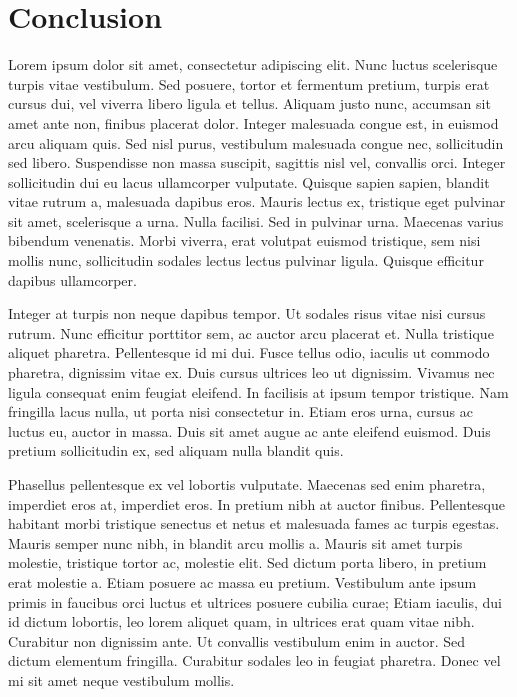 \section{Conclusion}

	Lorem ipsum dolor sit amet, consectetur adipiscing elit. Nunc luctus scelerisque turpis vitae vestibulum. Sed posuere, tortor et fermentum pretium, turpis erat cursus dui, vel viverra libero ligula et tellus. Aliquam justo nunc, accumsan sit amet ante non, finibus placerat dolor. Integer malesuada congue est, in euismod arcu aliquam quis. Sed nisl purus, vestibulum malesuada congue nec, sollicitudin sed libero. Suspendisse non massa suscipit, sagittis nisl vel, convallis orci. Integer sollicitudin dui eu lacus ullamcorper vulputate. Quisque sapien sapien, blandit vitae rutrum a, malesuada dapibus eros. Mauris lectus ex, tristique eget pulvinar sit amet, scelerisque a urna. Nulla facilisi. Sed in pulvinar urna. Maecenas varius bibendum venenatis. Morbi viverra, erat volutpat euismod tristique, sem nisi mollis nunc, sollicitudin sodales lectus lectus pulvinar ligula. Quisque efficitur dapibus ullamcorper.

	Integer at turpis non neque dapibus tempor. Ut sodales risus vitae nisi cursus rutrum. Nunc efficitur porttitor sem, ac auctor arcu placerat et. Nulla tristique aliquet pharetra. Pellentesque id mi dui. Fusce tellus odio, iaculis ut commodo pharetra, dignissim vitae ex. Duis cursus ultrices leo ut dignissim. Vivamus nec ligula consequat enim feugiat eleifend. In facilisis at ipsum tempor tristique. Nam fringilla lacus nulla, ut porta nisi consectetur in. Etiam eros urna, cursus ac luctus eu, auctor in massa. Duis sit amet augue ac ante eleifend euismod. Duis pretium sollicitudin ex, sed aliquam nulla blandit quis.

	Phasellus pellentesque ex vel lobortis vulputate. Maecenas sed enim pharetra, imperdiet eros at, imperdiet eros. In pretium nibh at auctor finibus. Pellentesque habitant morbi tristique senectus et netus et malesuada fames ac turpis egestas. Mauris semper nunc nibh, in blandit arcu mollis a. Mauris sit amet turpis molestie, tristique tortor ac, molestie elit. Sed dictum porta libero, in pretium erat molestie a. Etiam posuere ac massa eu pretium. Vestibulum ante ipsum primis in faucibus orci luctus et ultrices posuere cubilia curae; Etiam iaculis, dui id dictum lobortis, leo lorem aliquet quam, in ultrices erat quam vitae nibh. Curabitur non dignissim ante. Ut convallis vestibulum enim in auctor. Sed dictum elementum fringilla. Curabitur sodales leo in feugiat pharetra. Donec vel mi sit amet neque vestibulum mollis.

